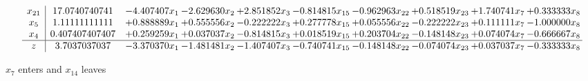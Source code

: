 \documentclass[10pt]{article}
\begin{document}
\[\begin{array}{c| c c@{\hskip 2pt} c@{\hskip 2pt} c@{\hskip 2pt} c@{\hskip 2pt} c@{\hskip 2pt} c@{\hskip 2pt} c@{\hskip 2pt} c@{\hskip 2pt} }
 x_{21}   &  17.0740740741 & -4.407407 x_{1} & -2.629630 x_{2} & + 2.851852 x_{3} & -0.814815 x_{15} & -0.962963 x_{22} & + 0.518519 x_{23} & + 1.740741 x_{7} & + 0.333333 x_{8}\\
 x_{5}   &  1.11111111111 & + 0.888889 x_{1} & + 0.555556 x_{2} & -0.222222 x_{3} & + 0.277778 x_{15} & + 0.055556 x_{22} & -0.222222 x_{23} & + 0.111111 x_{7} & -1.000000 x_{8}\\
 x_{4}   &  0.407407407407 & + 0.259259 x_{1} & + 0.037037 x_{2} & -0.814815 x_{3} & + 0.018519 x_{15} & + 0.203704 x_{22} & -0.148148 x_{23} & + 0.074074 x_{7} & -0.666667 x_{8}\\
\hline
z    &  3.7037037037 & -3.370370 x_{1} & -1.481481 x_{2} & -1.407407 x_{3} & -0.740741 x_{15} & -0.148148 x_{22} & -0.074074 x_{23} & + 0.037037 x_{7} & -0.333333 x_{8}\\
\end{array}\]


 $ x_{7} $ enters and $ x_{14} $ leaves 
\end{document}
